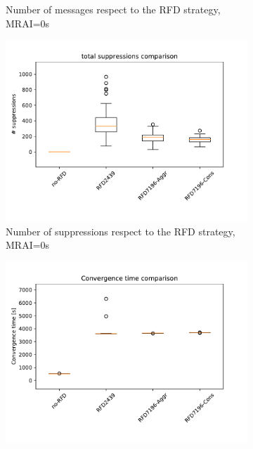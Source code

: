 \begin{figure}[H]
\begin{subfigure}[b]{0.325\textwidth}
         \caption{Number of messages respect to the RFD strategy, MRAI=0s}
         \label{fig:1000_RFD_MRAI30_messages_elephant}
     \end{subfigure}
     \hfill
     \begin{subfigure}[b]{0.325\textwidth}
         \centering
         \includegraphics[width=\textwidth]{images/RFD/miceVSelephants/MultiMRAI/0/elephants/cisco_1000MRAI0_rfd_comparison_suppressions_boxplot.pdf}
         \caption{Number of suppressions respect to the RFD strategy, MRAI=0s}
         \label{fig:1000_RFD_MRAI30_suppressions_elephant}
     \end{subfigure}
     \vfill
     \begin{subfigure}[b]{0.325\textwidth}
         \centering
         \includegraphics[width=\textwidth]{images/RFD/miceVSelephants/MultiMRAI/15/elephants/cisco_1000MRAI15_rfd_comparison_time_boxplot.pdf}

\end{subfigure}
\end{figure}
